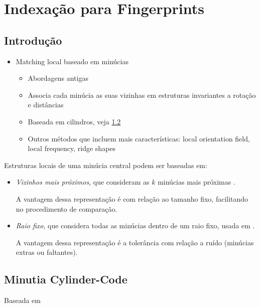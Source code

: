 \chapter{Indexação para Fingerprints}

\section{Introdução}

\begin{itemize}
    \item Matching local baseado em minúcias
    \begin{itemize}
        \item Abordagens antigas \cite{automated:hrechak1990,finger:willis2001}
        \item Associa cada minúcia as suas vizinhas em estruturas invariantes a rotação e distâncias\cite{globallocal:jiang2000,robustlocal:ratha2000}
        \item Baseada em cilindros, veja \cref{sec:mcc}
        \item Outros métodos que incluem mais características: local orientation field, local frequency, ridge shapes
    \end{itemize}
\end{itemize}

Estruturas locais de uma minúcia central podem ser baseadas em:
\begin{itemize}
    \item \textit{Vizinhos mais próximos}, que consideram as $k$ minúcias mais próximas \cite{globallocal:jiang2000}.
    
    A vantagem dessa representação é com relação ao tamanho fixo, facilitando no procedimento de comparação.
    
    \item \textit{Raio fixo}, que considera todas as minúcias dentro de um raio fixo, usada em \cite{robustlocal:ratha2000}.
    
    A vantagem dessa representação é a tolerância com relação a ruído (minúcias extras ou faltantes).
\end{itemize}

\section{Minutia Cylinder-Code}
\label{sec:mcc}

Baseada em \cite{mccmatching:cappelli2010,mccindexing:cappelli2010}

